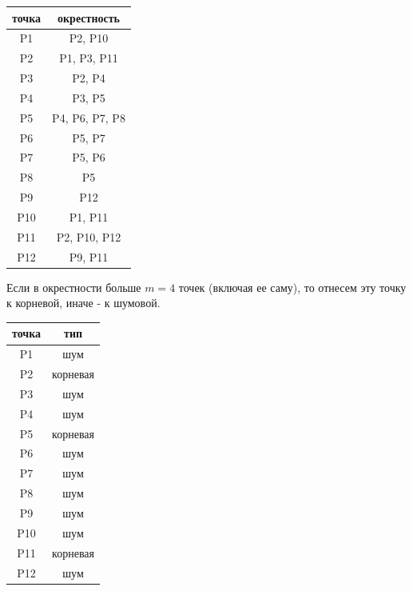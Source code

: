 \begin{center}
    \begin{tabular}{ |c|c| }
        \hline
        точка & окрестность    \\\hline
        P1    & P2, P10        \\ 
        P2    & P1, P3, P11    \\ 
        P3    & P2, P4         \\ 
        P4    & P3, P5         \\
        P5    & P4, P6, P7, P8 \\
        P6    & P5, P7         \\
        P7    & P5, P6         \\
        P8    & P5             \\
        P9    & P12            \\
        P10   & P1, P11        \\
        P11   & P2, P10, P12   \\
        P12   & P9, P11        \\
        \hline
    \end{tabular}
\end{center}

Если в окрестности больше $m=4$ точек (включая ее саму), то отнесем эту точку к корневой, иначе - к шумовой.

\begin{center}
    \begin{tabular}{ |c|c| }
        \hline
        точка & тип      \\\hline
        P1    & шум      \\ 
        P2    & корневая \\ 
        P3    & шум      \\ 
        P4    & шум      \\
        P5    & корневая \\
        P6    & шум      \\
        P7    & шум      \\
        P8    & шум      \\
        P9    & шум      \\
        P10   & шум      \\
        P11   & корневая \\
        P12   & шум      \\
        \hline
    \end{tabular}
\end{center}


